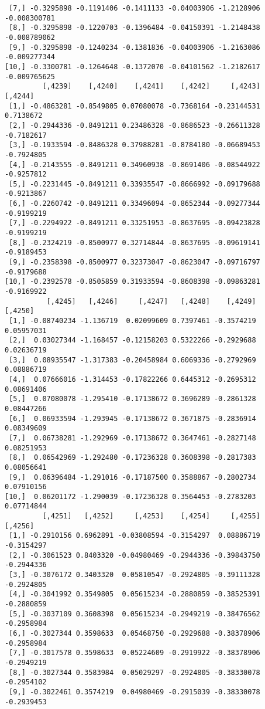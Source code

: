 \documentclass[
  letterpaper,
  DIV=11,
  numbers=noendperiod]{scrreprt}
\begin{document}
\begin{verbatim}
 [7,] -0.3295898 -0.1191406 -0.1411133 -0.04003906 -1.2128906 -0.008300781
 [8,] -0.3295898 -0.1220703 -0.1396484 -0.04150391 -1.2148438 -0.008789062
 [9,] -0.3295898 -0.1240234 -0.1381836 -0.04003906 -1.2163086 -0.009277344
[10,] -0.3300781 -0.1264648 -0.1372070 -0.04101562 -1.2182617 -0.009765625
         [,4239]    [,4240]    [,4241]    [,4242]     [,4243]    [,4244]
 [1,] -0.4863281 -0.8549805 0.07080078 -0.7368164 -0.23144531  0.7138672
 [2,] -0.2944336 -0.8491211 0.23486328 -0.8686523 -0.26611328 -0.7182617
 [3,] -0.1933594 -0.8486328 0.37988281 -0.8784180 -0.06689453 -0.7924805
 [4,] -0.2143555 -0.8491211 0.34960938 -0.8691406 -0.08544922 -0.9257812
 [5,] -0.2231445 -0.8491211 0.33935547 -0.8666992 -0.09179688 -0.9213867
 [6,] -0.2260742 -0.8491211 0.33496094 -0.8652344 -0.09277344 -0.9199219
 [7,] -0.2294922 -0.8491211 0.33251953 -0.8637695 -0.09423828 -0.9199219
 [8,] -0.2324219 -0.8500977 0.32714844 -0.8637695 -0.09619141 -0.9189453
 [9,] -0.2358398 -0.8500977 0.32373047 -0.8623047 -0.09716797 -0.9179688
[10,] -0.2392578 -0.8505859 0.31933594 -0.8608398 -0.09863281 -0.9169922
          [,4245]   [,4246]     [,4247]   [,4248]    [,4249]    [,4250]
 [1,] -0.08740234 -1.136719  0.02099609 0.7397461 -0.3574219 0.05957031
 [2,]  0.03027344 -1.168457 -0.12158203 0.5322266 -0.2929688 0.02636719
 [3,]  0.08935547 -1.317383 -0.20458984 0.6069336 -0.2792969 0.08886719
 [4,]  0.07666016 -1.314453 -0.17822266 0.6445312 -0.2695312 0.08691406
 [5,]  0.07080078 -1.295410 -0.17138672 0.3696289 -0.2861328 0.08447266
 [6,]  0.06933594 -1.293945 -0.17138672 0.3671875 -0.2836914 0.08349609
 [7,]  0.06738281 -1.292969 -0.17138672 0.3647461 -0.2827148 0.08251953
 [8,]  0.06542969 -1.292480 -0.17236328 0.3608398 -0.2817383 0.08056641
 [9,]  0.06396484 -1.291016 -0.17187500 0.3588867 -0.2802734 0.07910156
[10,]  0.06201172 -1.290039 -0.17236328 0.3564453 -0.2783203 0.07714844
         [,4251]   [,4252]     [,4253]    [,4254]     [,4255]    [,4256]
 [1,] -0.2910156 0.6962891 -0.03808594 -0.3154297  0.08886719 -0.3154297
 [2,] -0.3061523 0.8403320 -0.04980469 -0.2944336 -0.39843750 -0.2944336
 [3,] -0.3076172 0.3403320  0.05810547 -0.2924805 -0.39111328 -0.2924805
 [4,] -0.3041992 0.3549805  0.05615234 -0.2880859 -0.38525391 -0.2880859
 [5,] -0.3037109 0.3608398  0.05615234 -0.2949219 -0.38476562 -0.2958984
 [6,] -0.3027344 0.3598633  0.05468750 -0.2929688 -0.38378906 -0.2958984
 [7,] -0.3017578 0.3598633  0.05224609 -0.2919922 -0.38378906 -0.2949219
 [8,] -0.3027344 0.3583984  0.05029297 -0.2924805 -0.38330078 -0.2954102
 [9,] -0.3022461 0.3574219  0.04980469 -0.2915039 -0.38330078 -0.2939453

\end{verbatim}
\end{document}
